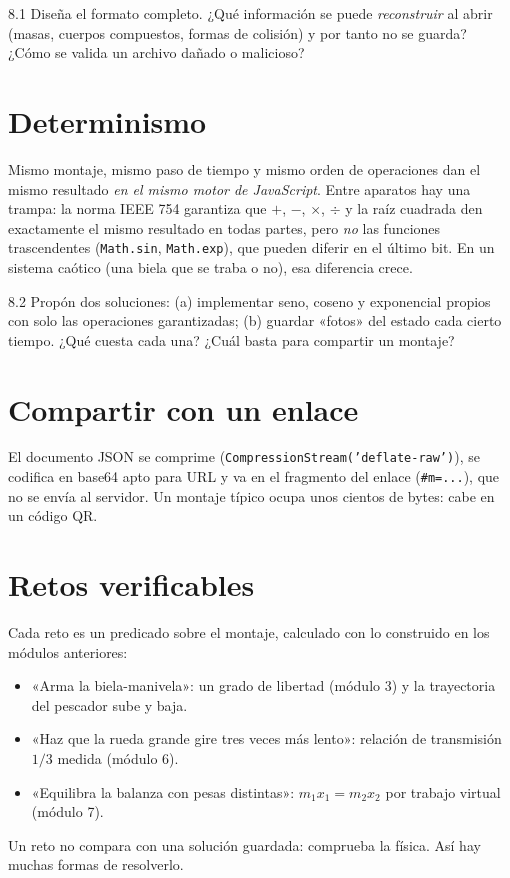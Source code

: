 \documentclass[11pt,a4paper]{article}
\begin{document}
\begin{ejercicio}{8.1}
Diseña el formato completo. ¿Qué información se puede \emph{reconstruir} al abrir (masas, cuerpos compuestos, formas
de colisión) y por tanto no se guarda? ¿Cómo se valida un archivo dañado o malicioso?
\end{ejercicio}

\section{Determinismo}

Mismo montaje, mismo paso de tiempo y mismo orden de operaciones dan el mismo resultado \emph{en el mismo motor de
JavaScript}. Entre aparatos hay una trampa: la norma IEEE 754 garantiza que $+$, $-$, $\times$, $\div$ y la raíz
cuadrada den exactamente el mismo resultado en todas partes, pero \emph{no} las funciones trascendentes
(\texttt{Math.sin}, \texttt{Math.exp}), que pueden diferir en el último bit. En un sistema caótico (una biela que se
traba o no), esa diferencia crece.

\begin{ejercicio}{8.2}
Propón dos soluciones: (a) implementar seno, coseno y exponencial propios con solo las operaciones garantizadas;
(b) guardar «fotos» del estado cada cierto tiempo. ¿Qué cuesta cada una? ¿Cuál basta para compartir un montaje?
\end{ejercicio}

\section{Compartir con un enlace}

El documento JSON se comprime (\texttt{CompressionStream('deflate-raw')}), se codifica en base64 apto para URL y va en
el fragmento del enlace (\texttt{\#m=...}), que no se envía al servidor. Un montaje típico ocupa unos cientos de bytes:
cabe en un código QR.

\section{Retos verificables}

Cada reto es un predicado sobre el montaje, calculado con lo construido en los módulos anteriores:
\begin{itemize}[leftmargin=*]
  \item «Arma la biela-manivela»: un grado de libertad (módulo 3) y la trayectoria del pescador sube y baja.
  \item «Haz que la rueda grande gire tres veces más lento»: relación de transmisión $1/3$ medida (módulo 6).
  \item «Equilibra la balanza con pesas distintas»: $m_1x_1 = m_2x_2$ por trabajo virtual (módulo 7).
\end{itemize}
Un reto no compara con una solución guardada: comprueba la física. Así hay muchas formas de resolverlo.
\end{document}
